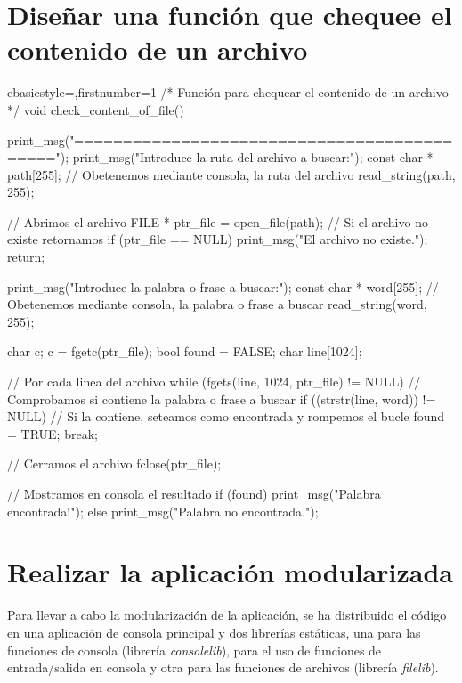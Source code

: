 \section{Diseñar una función que chequee el contenido de un archivo}
	\begin{sourcecodep}[]{c}{basicstyle={\fontsize{10}{10}\selectfont\ttfamily},firstnumber=1}{}
/*
Función para chequear el contenido de un archivo
*/
void check_content_of_file() {
	print_msg("============================================");
	print_msg("Introduce la ruta del archivo a buscar:");
	const char * path[255];
	// Obetenemos mediante consola, la ruta del archivo
	read_string(path, 255);
	
	// Abrimos el archivo
	FILE * ptr_file = open_file(path);
	// Si el archivo no existe retornamos
	if (ptr_file == NULL)
	{
		print_msg("El archivo no existe.");
		return;
	}
	
	print_msg("Introduce la palabra o frase a buscar:");
	const char * word[255];
	// Obetenemos mediante consola, la palabra o frase a buscar
	read_string(word, 255);
	
	char c;
	c = fgetc(ptr_file);
	bool found = FALSE;
	char line[1024];
	
	// Por cada linea del archivo
	while (fgets(line, 1024, ptr_file) != NULL) {
		// Comprobamos si contiene la palabra o frase a buscar
		if ((strstr(line, word)) != NULL) {
			// Si la contiene, seteamos como encontrada y rompemos el bucle
			found = TRUE;
			break;
		}
	}
	
	// Cerramos el archivo
	fclose(ptr_file);
	
	// Mostramos en consola el resultado
	if (found) {
		print_msg("Palabra encontrada!");
	}
	else {
		print_msg("Palabra no encontrada.");
	}
}\end{sourcecodep}
\newpage
\section{Realizar la aplicación modularizada}
	Para llevar a cabo la modularización de la aplicación, se ha distribuido el código en una aplicación de consola principal y dos librerías estáticas, una para las funciones de consola (librería \textit{consolelib}), para el uso de funciones de entrada/salida en consola y otra para las funciones de archivos (librería \textit{filelib}).
	
